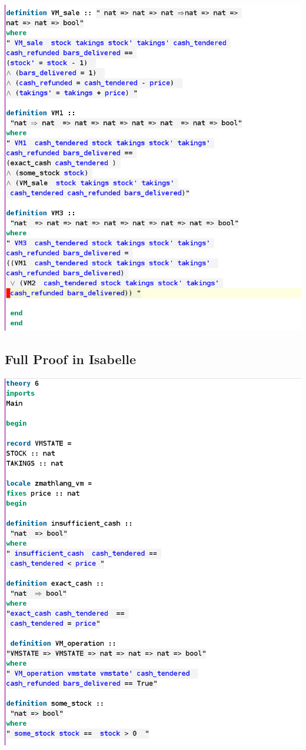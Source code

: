\noindent \includegraphics[scale=0.5]{examples/vm/5imagec.png}
%
\subsection{Full Proof in Isabelle}
\label{app:vm6}
\includegraphics[scale=0.5]{examples/vm/6imagea.png}


